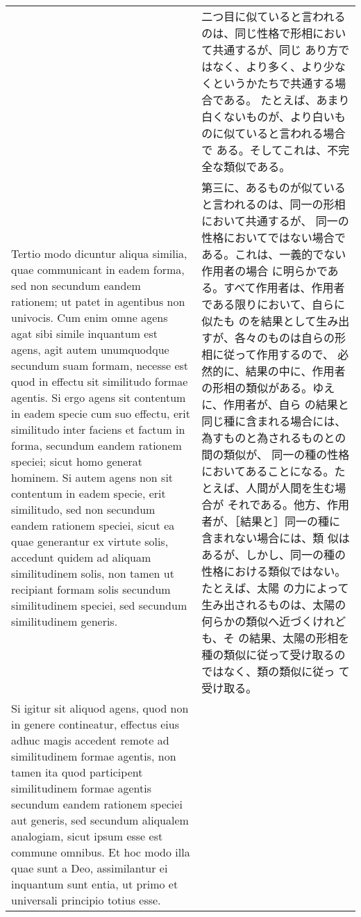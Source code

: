 \documentclass[10pt]{jsarticle}
\begin{document}
\begin{longtable}{p{21em}p{21em}}
&

二つ目に似ていると言われるのは、同じ性格で形相において共通するが、同じ
あり方ではなく、より多く、より少なくというかたちで共通する場合である。
たとえば、あまり白くないものが、より白いものに似ていると言われる場合で
ある。そしてこれは、不完全な類似である。

\\

Tertio modo dicuntur aliqua similia, quae communicant in eadem forma,
sed non secundum eandem rationem; ut patet in agentibus non
univocis. Cum enim omne agens agat sibi simile inquantum est agens,
agit autem unumquodque secundum suam formam, necesse est quod in
effectu sit similitudo formae agentis. Si ergo agens sit contentum in
eadem specie cum suo effectu, erit similitudo inter faciens et factum
in forma, secundum eandem rationem speciei; sicut homo generat
hominem. Si autem agens non sit contentum in eadem specie, erit
similitudo, sed non secundum eandem rationem speciei, sicut ea quae
generantur ex virtute solis, accedunt quidem ad aliquam similitudinem
solis, non tamen ut recipiant formam solis secundum similitudinem
speciei, sed secundum similitudinem generis.

&

第三に、あるものが似ていると言われるのは、同一の形相において共通するが、
同一の性格においてではない場合である。これは、一義的でない作用者の場合
に明らかである。すべて作用者は、作用者である限りにおいて、自らに似たも
のを結果として生み出すが、各々のものは自らの形相に従って作用するので、
必然的に、結果の中に、作用者の形相の類似がある。ゆえに、作用者が、自ら
の結果と同じ種に含まれる場合には、為すものと為されるものとの間の類似が、
同一の種の性格においてあることになる。たとえば、人間が人間を生む場合が
それである。他方、作用者が、［結果と］同一の種に含まれない場合には、類
似はあるが、しかし、同一の種の性格における類似ではない。たとえば、太陽
の力によって生み出されるものは、太陽の何らかの類似へ近づくけれども、そ
の結果、太陽の形相を種の類似に従って受け取るのではなく、類の類似に従っ
て受け取る。

\\

Si igitur sit aliquod agens, quod non in genere contineatur, effectus
eius adhuc magis accedent remote ad similitudinem formae agentis, non
tamen ita quod participent similitudinem formae agentis secundum
eandem rationem speciei aut generis, sed secundum aliqualem analogiam,
sicut ipsum esse est commune omnibus. Et hoc modo illa quae sunt a
Deo, assimilantur ei inquantum sunt entia, ut primo et universali
principio totius esse.


\end{longtable}
\end{document}
